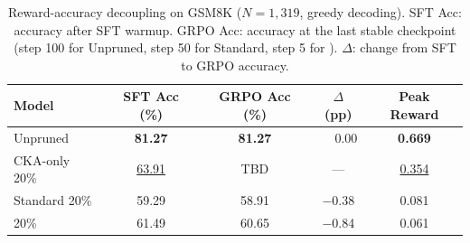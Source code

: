 \begin{table}[t]
\centering
\small
\caption{Reward-accuracy decoupling on GSM8K ($N{=}1{,}319$, greedy decoding). SFT Acc: accuracy after SFT warmup. GRPO Acc: accuracy at the last stable checkpoint (step 100 for Unpruned, step 50 for Standard, step 5 for \rasp{}). $\Delta$: change from SFT to GRPO accuracy.}
\label{tab:decoupling}
\begin{tabular}{lcccc}
\toprule
Model & SFT Acc (\%) & GRPO Acc (\%) & $\Delta$ (pp) & Peak Reward \\
\midrule
Unpruned & \textbf{81.27} & \textbf{81.27} & $\phantom{-}$0.00 & \textbf{0.669} \\
CKA-only 20\% & \underline{63.91} & TBD & --- & \underline{0.354} \\
Standard 20\% & 59.29 & 58.91 & $-$0.38 & 0.081 \\
\rasp{} 20\% & 61.49 & 60.65 & $-$0.84 & 0.061 \\
\bottomrule
\end{tabular}
\end{table}
